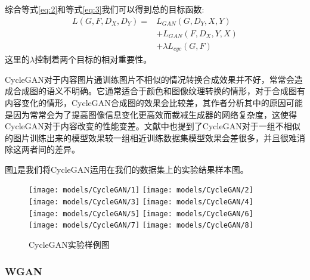 综合等式\ref{eq:2}和等式\ref{eq:3}我们可以得到总的目标函数:
\begin{equation}
\begin{aligned}
    L(G, F, D_X, D_Y) = & L_{GAN}(G,D_Y, X, Y) \\
    & + L_{GAN}(F,D_X, Y, X) \\
    & + \lambda L_{cyc}(G, F)
\end{aligned}
\end{equation}
这里的$\lambda$控制着两个目标的相对重要性。

CycleGAN对于内容图片通训练图片不相似的情况转换合成效果并不好，常常会造成合成图的语义不明确。它通常适合于颜色和图像纹理转换的情形，对于合成图有内容变化的情形，CycleGAN合成图的效果会比较差，其作者分析其中的原因可能是因为常常会为了提高图像信息变化更高效而裁减生成器的网络复杂度，这使得CycleGAN对于内容改变的性能变差。文献\cite{CycleGAN}中也提到了CycleGAN对于一组不相似的图片训练出来的模型效果较一组相近训练数据集模型效果会差很多，并且很难消除这两者间的差异。

图\ref{fig:cyclegan}是我们将CycleGAN运用在我们的数据集上的实验结果样本图。 

\begin{figure}[h]
    \centering

    \texttt{[image: models/CycleGAN/1]}
    \texttt{[image: models/CycleGAN/2]}
    \texttt{[image: models/CycleGAN/3]}
    \texttt{[image: models/CycleGAN/4]}
    \texttt{[image: models/CycleGAN/5]}
    \texttt{[image: models/CycleGAN/6]}\texttt{[image: models/CycleGAN/7]}
    \texttt{[image: models/CycleGAN/8]}
    \caption{CycleGAN实验样例图}
    \label{fig:cyclegan}
\end{figure} 


\subsubsection{WGAN}

